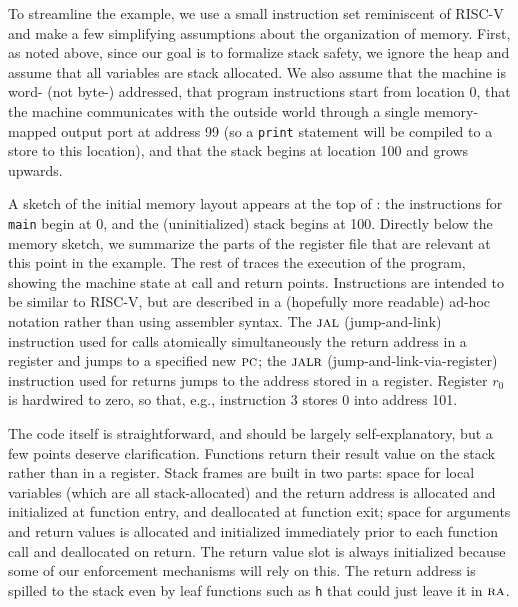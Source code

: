 \documentclass[acmsmall,review,anonymous]{acmart}\settopmatter{printfolios=true,printccs=false,printacmref=false}
\begin{document}
To streamline the example, we use a small instruction set reminiscent of
RISC-V and make a few simplifying assumptions about the organization of
memory.
%
First, as noted above, since our goal is to formalize stack safety, we
ignore the heap
and assume that all variables are stack allocated.
%
We also assume that the machine is word- (not byte-) addressed, that program
instructions start from location 0, that the machine communicates with the
outside world through a single memory-mapped output port at address 99 (so
a {\tt print} statement will be compiled to a store to this
location), and that the stack begins at location 100 and grows upwards.

A sketch of the initial memory layout appears at the top of
: the instructions for {\tt main} begin at 0,
and the (uninitialized)
stack begins at 100. Directly below the memory sketch, we summarize the parts
of the register file that are relevant at this point in the example.
%
The rest of  traces the execution of the
program, showing the machine state at call and return points.
Instructions are intended to
be similar to RISC-V, but are described in a (hopefully more readable)
ad-hoc notation
rather than using assembler syntax. The $\textsc{jal}$ (jump-and-link)
instruction used for calls atomically simultaneously the return address in a
register
and jumps to a specified new $\textsc{pc}$; the $\textsc{jalr}$ (jump-and-link-via-register)
instruction used for returns jumps to the address stored in a register.
Register $r_0$ is hardwired to zero, so that, e.g., instruction 3 stores $0$
into address 101.

The code itself is straightforward, and should be largely self-explanatory, but
a few points deserve clarification. Functions return their result value on the
stack rather than in a register.  Stack frames are built in two parts:
space for local variables (which are all stack-allocated) and the return address is allocated and initialized at function entry, and deallocated at function exit; space for arguments and return values is allocated and initialized immediately prior to each function call and deallocated on return. The return value slot is always initialized
because some of our enforcement mechanisms will rely on this.
The return address is spilled to the stack even by leaf functions such as
{\tt h} that could just leave it in $\textsc{ra}$. 
\end{document}
